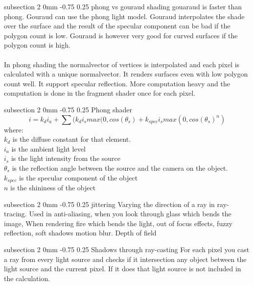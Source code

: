 \documentclass[a4paper,11pt]{article}
\makeatletter
\renewcommand{\subsection}{\@startsection
   {subsection}%
   {2}%
   {0mm}%
   {-0.75\baselineskip}%
   {0.25\baselineskip}%
   {\rmfamily\normalfont\slshape\normalsize}}%
\makeatother
\begin{document}
\subsection{phong vs gouraud shading}
gouaraud is faster than phong. Gouraud can use the phong light model. Gouraud interpolates the shade over the surface and the result of the specular component can be bad if the polygon count is low. Gouraud is however very good for curved surfaces if the polygon count is high.\\
\\
In phong shading the normalvector of vertices is interpolated and each pixel is calculated with a unique normalvector. It renders surfaces even with low polygon count well. It support specular reflection. More computation heavy and the computation is done in the fragment shader once for each pixel.

\subsection{Phong shader}
$$i=k_di_a+\sum(k_di_smax(0,cos(\theta_s)+k_{spec}i_smax(0,cos(\theta_s)^n)$$
where:\\
$k_d$ is the diffuse constant for that element.\\
$i_a$ is the ambient light level\\
$i_s$ is the light intensity from the source\\
$\theta_s$ is the reflection angle between the source and the camera on the object.\\
$k_{spec} $ is the specular component of the object\\
$n$ is the shininess of the object

\subsection{jittering}
Varying the direction of a ray in ray-tracing. Used in anti-aliasing, when you look through glass which bends the image, When rendering fire which bends the light, out of focus effects, fuzzy reflection, soft shadows motion blur. Depth of field

\subsection{Shadows through ray-casting}
For each pixel you cast a ray from every light source and checks if it intersection any object between the light source and the current pixel. If it does that light source is not included in the calculation.
\end{document}
